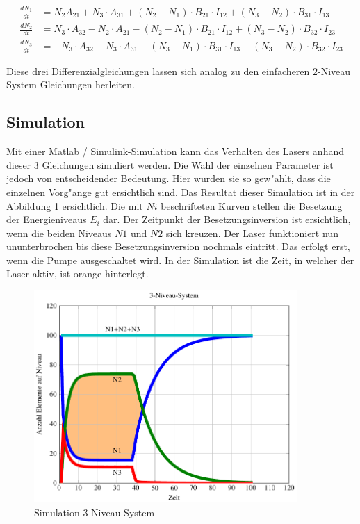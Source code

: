\begin{refsection}
\begin{align*}
\frac{dN_1}{dt} &=
N_2  A_{21} 
+ N_3 \cdot  A_{31}
+ (N_2 - N_1) \cdot B_{21}\cdot  I_{12}
+ (N_3 - N_2) \cdot B_{31}\cdot  I_{13}\\
\frac{dN_2}{dt} &=
N_3 \cdot  A_{32} 
- N_2 \cdot  A_{21}
- (N_2 - N_1) \cdot  B_{21}\cdot  I_{12}
+ (N_3 - N_2) \cdot  B_{32}\cdot  I_{23}\\
\frac{dN_3}{dt} &=
- N_3 \cdot  A_{32}
- N_3 \cdot  A_{31}
- (N_3 - N_1) \cdot  B_{31}\cdot  I_{13}
- (N_3 - N_2) \cdot  B_{32}\cdot  I_{23}
\end{align*}


Diese drei Differenzialgleichungen lassen sich analog zu den einfacheren
2-Niveau System Gleichungen herleiten.

\subsection{Simulation}
\label{3-Niveau Simulation}
Mit einer Matlab / Simulink-Simulation kann das Verhalten des Lasers anhand
dieser 3 Gleichungen simuliert werden.
Die Wahl der einzelnen Parameter ist jedoch von entscheidender Bedeutung.
Hier wurden sie so gew"ahlt, dass die einzelnen Vorg"ange gut ersichtlich sind.
Das Resultat dieser Simulation ist in der Abbildung
\ref{Simulation 3-Niveau System} ersichtlich.
Die mit $Ni$ beschrifteten Kurven stellen die Besetzung der Energieniveaus
$E_i$ dar.
Der Zeitpunkt der Besetzungsinversion ist ersichtlich, wenn die beiden Niveaus
$N1$ und $N2$ sich kreuzen.
Der Laser funktioniert nun ununterbrochen bis diese Besetzungsinversion
nochmals eintritt.
Das erfolgt erst, wenn die Pumpe ausgeschaltet wird.
In der Simulation ist die Zeit, in welcher der Laser aktiv, ist orange
hinterlegt.

\begin{flushleft}
\begin{figure}
\centering
\includegraphics[width = 10cm]{laser/bilder/3_niveau.pdf}
\caption{Simulation 3-Niveau System}
\label{Simulation 3-Niveau System}


\end{figure}
\end{flushleft}
\end{refsection}

